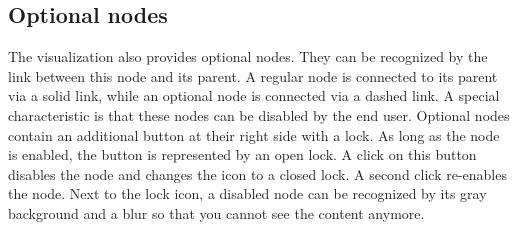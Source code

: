 \subsection{Optional nodes}\label{sec:optional-nodes}
The visualization also provides optional nodes. They can be recognized by the link between this node and its parent. A regular node is connected to its parent via a solid link, while an optional node is connected via a dashed link. A special characteristic is that these nodes can be disabled by the end user. Optional nodes contain an additional button at their right side with a lock. As long as the node is enabled, the button is represented by an open lock. A click on this button disables the node and changes the icon to a closed lock. A second click re-enables the node. Next to the lock icon, a disabled node can be recognized by its gray background and a blur so that you cannot see the content anymore.














